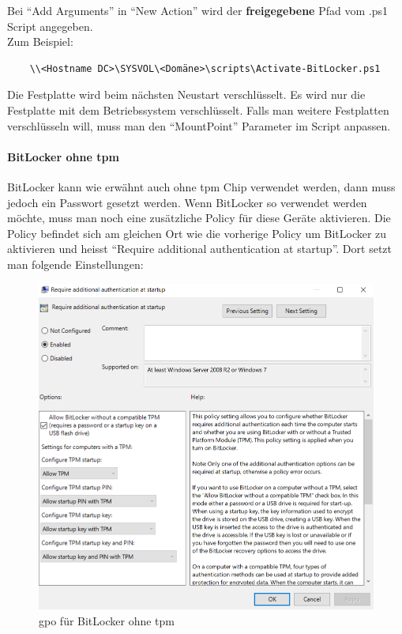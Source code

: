 Bei ``Add Arguments'' in ``New Action'' wird der \textbf{freigegebene} Pfad vom .ps1 Script angegeben.\\
Zum Beispiel:
\begin{lstlisting}
    \\<Hostname DC>\SYSVOL\<Domäne>\scripts\Activate-BitLocker.ps1
\end{lstlisting}

Die Festplatte wird beim nächsten Neustart verschlüsselt.
Es wird nur die Festplatte mit dem Betriebssystem verschlüsselt.
Falls man weitere Festplatten verschlüsseln will, muss man den ``MountPoint'' Parameter im Script anpassen.

\paragraph{BitLocker ohne \acrshort{tpm}}
BitLocker kann wie erwähnt auch ohne \acrshort{tpm} Chip verwendet werden, dann muss jedoch ein Passwort gesetzt werden.
Wenn BitLocker so verwendet werden möchte, muss man noch eine zusätzliche Policy für diese Geräte aktivieren.
Die Policy befindet sich am gleichen Ort wie die vorherige Policy um BitLocker zu aktivieren und heisst ``Require additional authentication at startup''.
Dort setzt man folgende Einstellungen:
\begin{figure}[H]
    \centering
    \includegraphics[width=\linewidth]{../img/Encryption/computers-without-tpm.png}
    \caption{\acrshort{gpo} für BitLocker ohne \acrshort{tpm}}
\end{figure}
